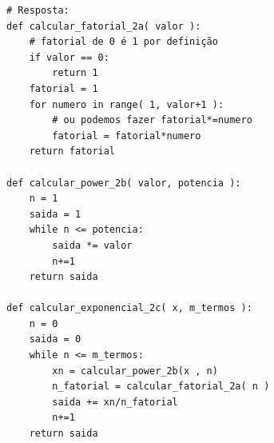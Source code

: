 \ifmostrarGabarito
\begin{verbatim}
# Resposta:
def calcular_fatorial_2a( valor ):
    # fatorial de 0 é 1 por definição
    if valor == 0:
        return 1
    fatorial = 1
    for numero in range( 1, valor+1 ):
        # ou podemos fazer fatorial*=numero
        fatorial = fatorial*numero
    return fatorial
    
def calcular_power_2b( valor, potencia ):
    n = 1
    saida = 1
    while n <= potencia:
        saida *= valor
        n+=1
    return saida

def calcular_exponencial_2c( x, m_termos ):
    n = 0
    saida = 0
    while n <= m_termos:
        xn = calcular_power_2b(x , n)
        n_fatorial = calcular_fatorial_2a( n )
        saida += xn/n_fatorial
        n+=1
    return saida
\end{verbatim}
\fi
